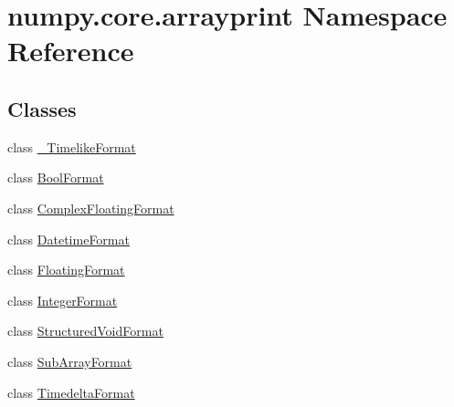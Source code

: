 \hypertarget{namespacenumpy_1_1core_1_1arrayprint}{}\section{numpy.\+core.\+arrayprint Namespace Reference}
\label{namespacenumpy_1_1core_1_1arrayprint}
\subsection*{Classes}
\begin{DoxyCompactItemize}
\item 
class \hyperlink{classnumpy_1_1core_1_1arrayprint_1_1__TimelikeFormat}{\+\_\+\+Timelike\+Format}
\item 
class \hyperlink{classnumpy_1_1core_1_1arrayprint_1_1BoolFormat}{Bool\+Format}
\item 
class \hyperlink{classnumpy_1_1core_1_1arrayprint_1_1ComplexFloatingFormat}{Complex\+Floating\+Format}
\item 
class \hyperlink{classnumpy_1_1core_1_1arrayprint_1_1DatetimeFormat}{Datetime\+Format}
\item 
class \hyperlink{classnumpy_1_1core_1_1arrayprint_1_1FloatingFormat}{Floating\+Format}
\item 
class \hyperlink{classnumpy_1_1core_1_1arrayprint_1_1IntegerFormat}{Integer\+Format}
\item 
class \hyperlink{classnumpy_1_1core_1_1arrayprint_1_1StructuredVoidFormat}{Structured\+Void\+Format}
\item 
class \hyperlink{classnumpy_1_1core_1_1arrayprint_1_1SubArrayFormat}{Sub\+Array\+Format}
\item 
class \hyperlink{classnumpy_1_1core_1_1arrayprint_1_1TimedeltaFormat}{Timedelta\+Format}
\end{DoxyCompactItemize}
